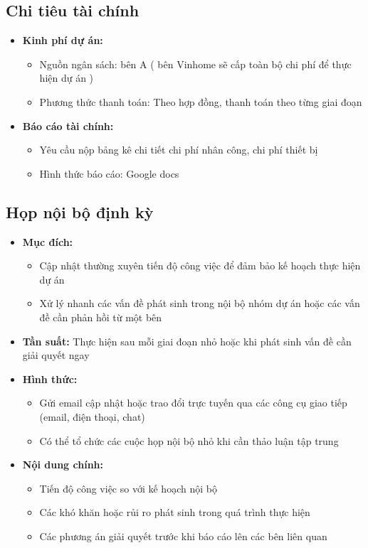 \subsection{Chi tiêu tài chính}
\begin{itemize}
    \item \textbf{Kinh phí dự án:}
    \begin{itemize}
    \item Nguồn ngân sách: bên A ( bên Vinhome sẽ cấp toàn bộ chi phí để thực hiện dự án )
    \item Phương thức thanh toán: Theo hợp đồng, thanh toán theo từng giai đoạn
    \end{itemize}
    \item \textbf{Báo cáo tài chính:}
    \begin{itemize}
        \item Yêu cầu nộp bảng kê chi tiết chi phí nhân công, chi phí thiết bị
        \item Hình thức báo cáo: Google docs
    \end{itemize}
\end{itemize}
\subsection{Họp nội bộ định kỳ}
\begin{itemize}
    \item \textbf{Mục đích:}
    \begin{itemize}
    \item Cập nhật thường xuyên tiến độ công việc để đảm bảo kế hoạch thực hiện dự án
    \item Xử lý nhanh các vấn đề phát sinh trong nội bộ nhóm dự án hoặc các vấn đề cần phản hồi từ một bên
    \end{itemize}
    \item \textbf{Tần suất:} Thực hiện sau mỗi giai đoạn nhỏ hoặc khi phát sinh vấn đề cần giải quyết ngay
    \item \textbf{Hình thức:}
    \begin{itemize}
        \item Gửi email cập nhật hoặc trao đổi trực tuyến qua các công cụ giao tiếp (email, điện thoại, chat)
        \item Có thể tổ chức các cuộc họp nội bộ nhỏ khi cần thảo luận tập trung
    \end{itemize}
    \item \textbf{Nội dung chính:}
    \begin{itemize}
        \item Tiến độ công việc so với kế hoạch nội bộ
        \item Các khó khăn hoặc rủi ro phát sinh trong quá trình thực hiện
        \item Các phương án giải quyết trước khi báo cáo lên các bên liên quan
    \end{itemize}
\end{itemize}
